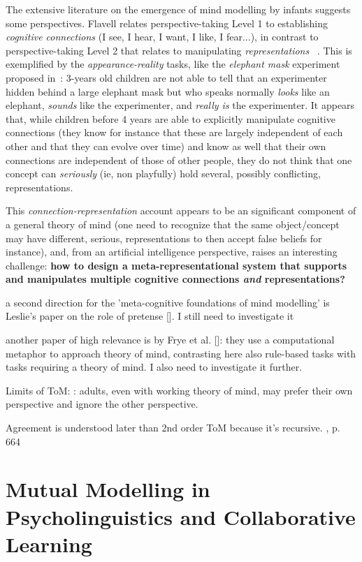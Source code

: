 \documentclass{sig-alternate}
\begin{document}
The extensive literature on the emergence of mind modelling by infants suggests
some perspectives. Flavell relates perspective-taking Level 1 to establishing
\emph{cognitive connections} (I see, I hear, I want, I like, I fear...), in
contrast to perspective-taking Level 2 that relates to manipulating
\emph{representations }~\cite{flavell1990developmental}.  This is exemplified by
the \emph{appearance-reality} tasks, like the \emph{elephant mask} experiment
proposed in~\cite{flavell1990developmental}: 3-years old children are not able
to tell that an experimenter hidden behind a large elephant mask but who speaks
normally \emph{looks} like an elephant, \emph{sounds} like the experimenter, and
\emph{really is} the experimenter.  It appears that, while children before 4
years are able to explicitly manipulate cognitive connections (they know for
instance that these are largely independent of each other and that they can
evolve over time) and know as well that their own connections are independent of
those of other people, they do not think that one concept can \emph{seriously}
(ie, non playfully) hold several, possibly conflicting, representations.

This \emph{connection-representation} account appears to be an significant
component of a general theory of mind (one need to recognize that the same
object/concept may have different, serious, representations to then accept false
beliefs for instance), and, from an artificial intelligence perspective, raises
an interesting challenge: \textbf{how to design a meta-representational system
that supports and manipulates multiple cognitive connections \emph{and}
representations?} 

a second direction for the 'meta-cognitive foundations of mind modelling' is
Leslie's paper on the role of pretense []. I still need to investigate it

another paper of high relevance is by Frye et al. []: they use a computational
metaphor to approach theory of mind, contrasting here also
rule-based tasks with tasks requiring a theory of mind. I also need to
investigate it further.

Limits of ToM:
\cite{keysar2003limits}: adults, even with working theory of mind, may prefer
their own perspective and ignore the other perspective.

Agreement is understood later than 2nd order ToM because it's recursive.
\cite{verbrugge2009logic}, p. 664

\section{Mutual Modelling in Psycholinguistics and Collaborative Learning}
\end{document}
